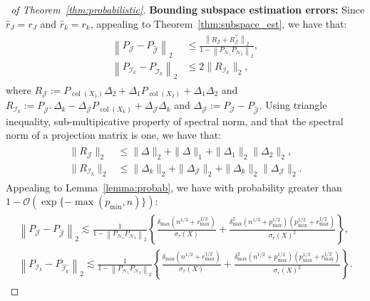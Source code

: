 \documentclass{amsart}
\DeclareMathOperator*{\col}{col}
\newcommand{\Ncal}{\mathcal{N}}
\newcommand{\Jcal}{\mathcal{J}}
\newcommand{\Ical}{\mathcal{I}}
\begin{document}
\begin{proof}[~of Theorem~\ref{thm:probabilistic}]
{\vspace{0.1in}
\noindent \textbf{Bounding subspace estimation errors:} Since $\widehat r_J = r_J$ and $\widehat r_k = r_k$, appealing to Theorem~\ref{thm:subspace_est}, we have that:
\begin{eqnarray*}
\begin{aligned}
\left\| P_{\Jcal} - P_{\widehat{\Jcal}} \right\|_2 &\leq  \frac{\left\|R_{\Jcal} + R^\top_{\Jcal}\right\|_2}{1-\left\|P_{\Ncal_1} P_{\Ncal_2}\right\|_2},\\
\left\|P_{\Ical_k} - P_{\widehat{\Ical}_k}\right\|_2 &\leq {2}\|R_{\Ical_k}\|_2,
\end{aligned}
\end{eqnarray*}
where ${R}_{\Jcal} := P_{\col(X_1)} \Delta_2 + \Delta_1 P_{\col(X_2)} + \Delta_1 \Delta_2$ and {$R_{\Ical_k} := P_{\Jcal^\perp} \Delta_k - \Delta_{\Jcal} P_{\col(X_k)}+ \Delta_{\Jcal} \Delta_k$} and $\Delta_{\Jcal} :=  P_{\Jcal} - P_{\widehat{\Jcal}}$. Using triangle inequality, sub-multipicative property of spectral norm, and that the spectral norm of a projection matrix is one, we have that:
\begin{eqnarray*}
\begin{aligned}
\|{R}_{\Jcal}\|_2 &\leq \|\Delta\|_2 + \|\Delta\|_1 + \|\Delta_1\|_2\|\Delta_2\|_2, \\
\|{R}_{\Ical_k}\|_2 &\leq \|\Delta_k\|_2 + \|\Delta_{\Jcal}\|_2 +  \|\Delta_k\|_2\|\Delta_{\Jcal}\|_2.
\end{aligned}
\end{eqnarray*}
Appealing to Lemma~\ref{lemma:probab}, we have with probability greater than $1-\mathcal{O}(\exp\{-\max(p_{\min},n)\})$:
\begin{eqnarray*}
\begin{aligned}
    \left\| P_{\Jcal} - P_{\widehat{\Jcal}} \right\|_2 \lesssim \frac{1}{1-\left\|P_{\Ncal_1} P_{\Ncal_2}\right\|_2}\left\{\frac{\delta_{\max}(n^{1/2}+r_{\max}^{1/2})}{\sigma_{r}(X)} + \frac{\delta_{\max}^2(n^{1/2}+p_{\max}^{1/2})(p_{\max}^{1/2}+r_{\max}^{1/2})}{\sigma_{r}(X)^2}\right\}, \\
    \left\| P_{\Ical_k} - P_{\widehat{\Ical_k}} \right\|_2 \lesssim \frac{1}{1-\left\|P_{\Ncal_1} P_{\Ncal_2}\right\|_2}\left\{\frac{\delta_{\max}(n^{1/2}+r_{\max}^{1/2})}{\sigma_{r}(X)} + \frac{\delta_{\max}^2(n^{1/2}+p_{\max}^{1/2})(p_{\max}^{1/2}+r_{\max}^{1/2})}{\sigma_{r}(X)^2}\right\}.
 \end{aligned}
\end{eqnarray*}}  
\end{proof}
\end{document}
